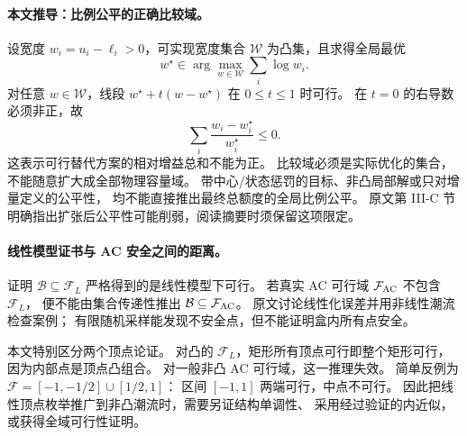 \paragraph{本文推导：比例公平的正确比较域。}
设宽度 $w_i=u_i-\ell_i>0$，可实现宽度集合 $\mathcal W$ 为凸集，且求得全局最优
\begin{equation}
 w^\star\in\arg\max_{w\in\mathcal W}\sum_i\log w_i.
 \label{eq:eng-s11-logfair}
\end{equation}
对任意 $w\in\mathcal W$，线段 $w^\star+t(w-w^\star)$ 在 $0\leq t\leq1$ 时可行。
在 $t=0$ 的右导数必须非正，故
\begin{equation}
 \sum_i\frac{w_i-w_i^\star}{w_i^\star}\leq0.
 \label{eq:eng-s11-propfair}
\end{equation}
这表示可行替代方案的相对增益总和不能为正。
比较域必须是实际优化的集合，不能随意扩大成全部物理容量域。
带中心/状态惩罚的目标、非凸局部解或只对增量定义的公平性，
均不能直接推出最终总额度的全局比例公平。
原文第 III-C 节明确指出扩张后公平性可能削弱，阅读摘要时须保留这项限定。

\paragraph{线性模型证书与 AC 安全之间的距离。}
证明 $\mathcal B\subseteq\mathcal F_L$ 严格得到的是线性模型下可行。
若真实 AC 可行域 $\mathcal F_{\rm AC}$ 不包含 $\mathcal F_L$，
便不能由集合传递性推出 $\mathcal B\subseteq\mathcal F_{\rm AC}$。
原文讨论线性化误差并用非线性潮流检查案例；
有限随机采样能发现不安全点，但不能证明盒内所有点安全。

本文特别区分两个顶点论证。
对凸的 $\mathcal F_L$，矩形所有顶点可行即整个矩形可行，因为内部点是顶点凸组合。
对一般非凸 AC 可行域，这一推理失效。
简单反例为 $\mathcal F=[-1,-1/2]\cup[1/2,1]$：
区间 $[-1,1]$ 两端可行，中点不可行。
因此把线性顶点枚举推广到非凸潮流时，需要另证结构单调性、
采用经过验证的内近似，或获得全域可行性证明。

